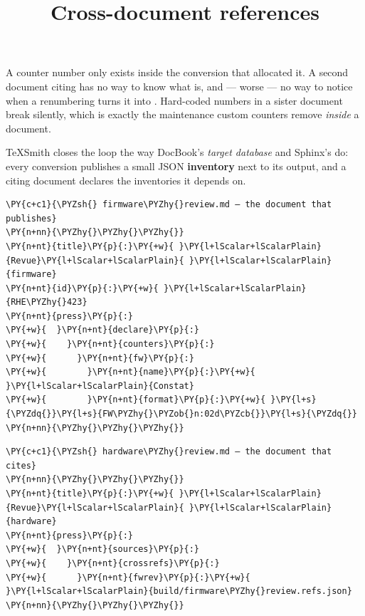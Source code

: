 \documentclass[a4paper,twoside]{article}
\title{Cross-document references}
\author{}\date{}
\begin{document}
\maketitle
A counter number only exists inside the conversion that allocated it. A second
document citing  has no way to know what  is, and --- worse --- no way
to notice when a renumbering turns it into . Hard-coded numbers in a
sister document break silently, which is exactly the maintenance
custom counters remove \emph{inside} a document.

TeXSmith closes the loop the way DocBook's \emph{target database} and Sphinx's
 do: every conversion publishes a small JSON \textbf{inventory} next to
its output, and a citing document declares the inventories it depends on.
\begin{tscode}[lang=yaml, engine=pygments]
\begin{Verbatim}[commandchars=\\\{\},breaklines, breakanywhere, commandchars=\\\{\}]
\PY{c+c1}{\PYZsh{} firmware\PYZhy{}review.md — the document that publishes}
\PY{n+nn}{\PYZhy{}\PYZhy{}\PYZhy{}}
\PY{n+nt}{title}\PY{p}{:}\PY{+w}{ }\PY{l+lScalar+lScalarPlain}{Revue}\PY{l+lScalar+lScalarPlain}{ }\PY{l+lScalar+lScalarPlain}{firmware}
\PY{n+nt}{id}\PY{p}{:}\PY{+w}{ }\PY{l+lScalar+lScalarPlain}{RHE\PYZhy{}423}
\PY{n+nt}{press}\PY{p}{:}
\PY{+w}{  }\PY{n+nt}{declare}\PY{p}{:}
\PY{+w}{    }\PY{n+nt}{counters}\PY{p}{:}
\PY{+w}{      }\PY{n+nt}{fw}\PY{p}{:}
\PY{+w}{        }\PY{n+nt}{name}\PY{p}{:}\PY{+w}{ }\PY{l+lScalar+lScalarPlain}{Constat}
\PY{+w}{        }\PY{n+nt}{format}\PY{p}{:}\PY{+w}{ }\PY{l+s}{\PYZdq{}}\PY{l+s}{FW\PYZhy{}\PYZob{}n:02d\PYZcb{}}\PY{l+s}{\PYZdq{}}
\PY{n+nn}{\PYZhy{}\PYZhy{}\PYZhy{}}
\end{Verbatim}
\end{tscode}
\begin{tscode}[lang=yaml, engine=pygments]
\begin{Verbatim}[commandchars=\\\{\},breaklines, breakanywhere, commandchars=\\\{\}]
\PY{c+c1}{\PYZsh{} hardware\PYZhy{}review.md — the document that cites}
\PY{n+nn}{\PYZhy{}\PYZhy{}\PYZhy{}}
\PY{n+nt}{title}\PY{p}{:}\PY{+w}{ }\PY{l+lScalar+lScalarPlain}{Revue}\PY{l+lScalar+lScalarPlain}{ }\PY{l+lScalar+lScalarPlain}{hardware}
\PY{n+nt}{press}\PY{p}{:}
\PY{+w}{  }\PY{n+nt}{sources}\PY{p}{:}
\PY{+w}{    }\PY{n+nt}{crossrefs}\PY{p}{:}
\PY{+w}{      }\PY{n+nt}{fwrev}\PY{p}{:}\PY{+w}{ }\PY{l+lScalar+lScalarPlain}{build/firmware\PYZhy{}review.refs.json}
\PY{n+nn}{\PYZhy{}\PYZhy{}\PYZhy{}}
\end{Verbatim}
\end{tscode}
\end{document}
